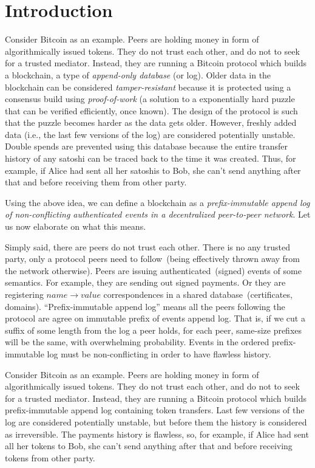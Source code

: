 \documentclass[]{report}   %
\begin{document}
\section{Introduction}     


Consider Bitcoin as an example. Peers are holding money in form of algorithmically issued tokens. They do not trust each other, and do not to seek for a trusted mediator. Instead, they are running a Bitcoin protocol which builds a blockchain, a type of {\em append-only database} (or log). Older data in the blockchain can be considered {\em tamper-resistant} because it is protected using a consensus build using {\em proof-of-work} (a solution to a exponentially hard puzzle that can be verified efficiently, once known). The design of the protocol is such that the puzzle becomes harder as the data gets older. However, freshly added data (i.e., the last few versions of the log) are considered potentially unstable. Double spends are prevented using this database because the entire transfer history of any satoshi can be traced back to the time it was created. Thus, for example, if Alice had sent all her satoshis to Bob, she can't send anything after that and before receiving them from other party.

Using the above idea, we can define a blockchain as a {\em prefix-immutable append log of non-conflicting authenticated events in a decentralized peer-to-peer network}. Let us now elaborate on what this means.

Simply said, there are peers do not trust each other. There is no any trusted party, only a protocol peers need to follow~(being effectively thrown away from the network otherwise). Peers are issuing authenticated~(signed) events of some semantics. For example, they are sending out signed payments. Or they are registering \(name \rightarrow value\) correspondences in a shared database~(certificates, domains). ``Prefix-immutable append log'' means all the peers following the protocol are agree on immutable prefix of events append log. That is, if we cut a suffix of some length from the log a peer holds, for each peer, same-size prefixes will be the same, with overwhelming probability. Events in the ordered prefix-immutable log must be non-conflicting in order to have flawless history.

Consider Bitcoin as an example. Peers are holding money in form of algorithmically issued tokens. They do not trust each other, and do not to seek for a trusted mediator. Instead, they are running a Bitcoin protocol which builds prefix-immutable append log containing token transfers. Last few versions of the log are considered potentially unstable, but before them the history is considered as irreversible. The payments history is flawless, so, for example, if Alice had sent all her tokens to Bob, she can't send anything after that and before receiving tokens from other party.
\end{document}
